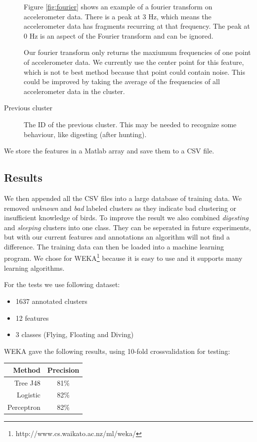 \begin{description}
  Figure \ref{fig:fourier} shows an example of a fourier transform on accelerometer data. There is a peak at 3 Hz, which means the accelerometer data has fragments recurring at that frequency. The peak at 0 Hz is an aspect of the Fourier transform and can be ignored. 

  Our fourier transform only returns the maxiumum frequencies of one point of accelerometer data. We currently use the center point for this feature, which is not te best method because that point could contain noise. This could be improved by taking the average of the frequencies of all accelerometer data in the cluster.
  \item[Previous cluster] The ID of the previous cluster. This may be needed to recognize some behaviour, like digesting (after hunting).
 \end{description}

 We store the features in a Matlab array and save them to a CSV file.

 \subsection{Results}
 We then appended all the CSV files into a large database of training data. We removed \emph{unknown} and \emph{bad} labeled clusters as they indicate bad clustering or insufficient knowledge of birds. To improve the result we also combined \emph{digesting} and \emph{sleeping} clusters into one class. They can be seperated in future experiments, but with our current features and annotations an algorithm will not find a difference. The training data can then be loaded into a machine learning program. We chose for WEKA\footnote{http://www.cs.waikato.ac.nz/ml/weka/} because it is easy to use and it supports many learning algorithms.

 For the tests we use following dataset:
\begin{itemize}
\item 1637 annotated clusters
\item 12 features
\item 3 classes (Flying, Floating and Diving)
\end{itemize}


WEKA gave the following results, using 10-fold crossvalidation for testing:

\begin{center}
\begin{tabular}{r|c}
	\textnormal{Method} & \textnormal{Precision} \\ \hline 
	Tree J48 & 81\% \\
	Logistic & 82\% \\
  Perceptron & 82\% \\
\end{tabular}
\end{center}


